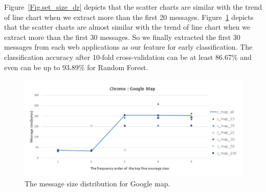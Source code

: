 Figure~\ref{Fig.set_size_dr} depicts that the scatter charts are similar with the trend of line chart when we extract more than the first 20 messages. Figure~\ref{Fig.set_size_map} depicts that the scatter charts are almost similar with the trend of line chart when we extract more than the first 30 messages. So we finally extracted the first 30 messages from each web applications as our feature for early classification. The classification accuracy after 10-fold cross-validation can be at least 86.67\% and even can be up to 93.89\% for Random Forest.


\begin{figure}[H]
\begin{center} 
\includegraphics[width=1.1\textwidth]{early_map}
\end{center}
\caption{The message size distribution for Google map.}
\label{Fig.set_size_map}
\end{figure}

